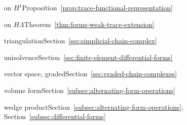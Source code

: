 \par\noindent\hspace*{1em}\label{index:trace-operator-on-h-1}{on $H^1$}\quad Proposition~\ref{prop:trace-functional-representation}

\par\noindent\hspace*{1em}\label{index:trace-operator-on-h-lambda}{on $H\Lambda$}\quad Theorem~\ref{thm:forms-weak-trace-extension}

\par\noindent\hspace*{0em}\label{index:triangulation}{triangulation}\quad Section~\ref{sec:simplicial-chain-complex}

\par\noindent\hspace*{0em}\label{index:unisolvence}{unisolvence}\quad Section~\ref{sec:finite-element-differential-forms}

\par\noindent\hspace*{0em}\label{index:vector-space-graded}{vector space, graded}\quad Section~\ref{sec:graded-chain-complexes}

\par\noindent\hspace*{0em}\label{index:volume-form}{volume form}\quad Section~\ref{subsec:alternating-form-operations}

\par\noindent\hspace*{0em}\label{index:wedge-product}{wedge product}\quad Section~\ref{subsec:alternating-form-operations}, Section~\ref{subsec:differential-forms}
\par\endgroup
